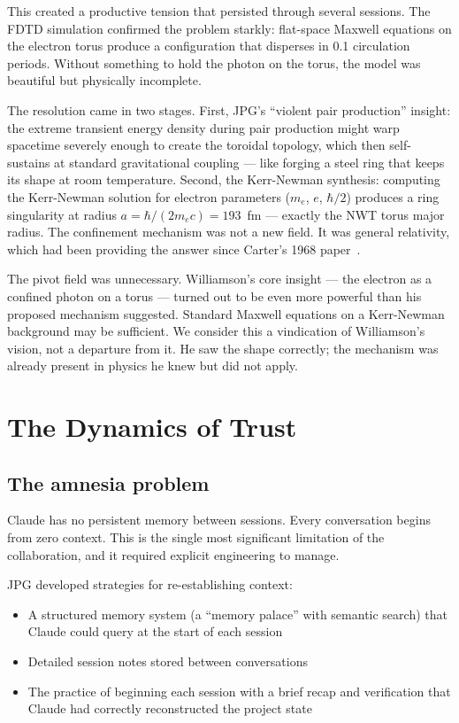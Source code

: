 \documentclass[11pt,a4paper]{article}
\begin{document}
This created a productive tension that persisted through several sessions. The FDTD simulation confirmed the problem starkly: flat-space Maxwell equations on the electron torus produce a configuration that disperses in 0.1 circulation periods. Without something to hold the photon on the torus, the model was beautiful but physically incomplete.

The resolution came in two stages. First, JPG's ``violent pair production'' insight: the extreme transient energy density during pair production might warp spacetime severely enough to create the toroidal topology, which then self-sustains at standard gravitational coupling --- like forging a steel ring that keeps its shape at room temperature. Second, the Kerr-Newman synthesis: computing the Kerr-Newman solution for electron parameters ($m_e$, $e$, $\hbar/2$) produces a ring singularity at radius $a = \hbar/(2m_e c) = 193$~fm --- exactly the NWT torus major radius. The confinement mechanism was not a new field. It was general relativity, which had been providing the answer since Carter's 1968 paper~\cite{carter1968}.

The pivot field was unnecessary. Williamson's core insight --- the electron as a confined photon on a torus --- turned out to be even more powerful than his proposed mechanism suggested. Standard Maxwell equations on a Kerr-Newman background may be sufficient. We consider this a vindication of Williamson's vision, not a departure from it. He saw the shape correctly; the mechanism was already present in physics he knew but did not apply.

\section{The Dynamics of Trust}
\label{sec:trust}

\subsection{The amnesia problem}

Claude has no persistent memory between sessions. Every conversation begins from zero context. This is the single most significant limitation of the collaboration, and it required explicit engineering to manage.

JPG developed strategies for re-establishing context:
\begin{itemize}
  \item A structured memory system (a ``memory palace'' with semantic search) that Claude could query at the start of each session
  \item Detailed session notes stored between conversations
  \item The practice of beginning each session with a brief recap and verification that Claude had correctly reconstructed the project state
\end{itemize}
\end{document}
